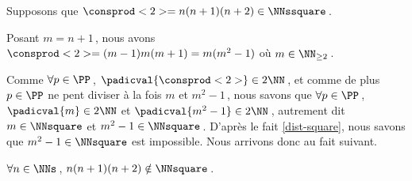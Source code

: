 Supposons que $\consprod<2> = n(n+1)(n+2) \in \NNssquare$\,.

\medskip

Posant $m = n+1$\,, nous avons $\consprod<2> = (m-1)m(m+1) = m(m^2 - 1)$ où $m \in \NN_{\geq 2}$\,.

\medskip

Comme $\forall p \in \PP$\,, $\padicval{\consprod<2>} \in 2 \NN$\,, et comme de plus $p \in \PP$ ne pent diviser à la fois $m$ et $m^2 - 1$\,, nous savons que $\forall p \in \PP$\,, 
$\padicval{m} \in 2 \NN$ et $\padicval{m^2 - 1} \in 2 \NN$\,,
autrement dit 
$m \in \NNsquare$ et $m^2 - 1 \in \NNsquare$\,.
D'après le fait \ref{dist-square}, nous savons que $m^2 - 1 \in \NNsquare$ est impossible.
%
Nous arrivons donc au fait suivant. 

\begin{fact}
	 $\forall n \in \NNs$\,, $n(n+1)(n+2) \notin \NNsquare$\,.
\end{fact}
